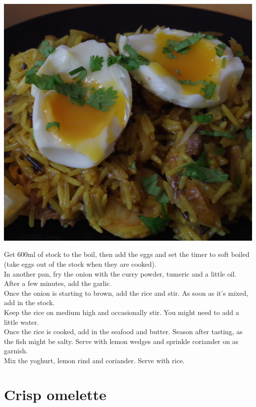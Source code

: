 \documentclass{tufte-book}
\begin{document}
\begin{marginfigure}%
  \includegraphics[width=\linewidth]{kedgeree.png}
\end{marginfigure}

\smallskip
Get 600ml of stock to the boil, then add the eggs and set the timer to soft boiled (take eggs out of the stock when they are cooked).
\\In another pan, fry the onion with the curry powder, tumeric and a little oil. After a few minutes, add the garlic.
\\Once the onion is starting to brown, add the rice and stir. As soon as it's mixed, add in the stock. 
\\Keep the rice on medium high and occasionally stir. You might need to add a little water.
\\Once the rice is cooked, add in the seafood and butter. Season after tasting, as the fish might be salty. Serve with lemon wedges and sprinkle coriander on as garnish.
\\Mix the yoghurt, lemon rind and coriander. Serve with rice.


\section{Crisp omelette}
\end{document}
